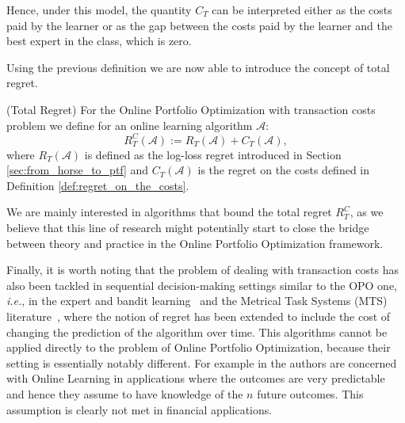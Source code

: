 Hence, under this model, the quantity $C_T$ can be interpreted either as the costs paid by the learner or as the gap between the costs paid by the learner and the best expert in the class, which is zero.

Using the previous definition we are now able to introduce the concept of total regret.

\begin{definition}(Total Regret)\label{def:totoal_regret}
For the Online Portfolio Optimization with transaction costs problem we define for an online learning algorithm $\mathcal A$: 
\begin{equation}
R_T^C(\mathcal A):=R_T(\mathcal A)+C_T(\mathcal A),
\end{equation}
where $R_T(\mathcal A)$ is defined as the log-loss regret introduced in Section \ref{sec:from_horse_to_ptf} and $C_T(\mathcal A)$ is the regret on the costs defined in Definition \ref{def:regret_on_the_costs}.
\end{definition}

We are mainly interested in algorithms that bound the total regret $R_T^C$, as we believe that this line of research might potentially start to close the bridge between theory and practice in the Online Portfolio Optimization framework.

Finally, it is worth noting that the problem of dealing with transaction costs has also been tackled in sequential decision-making settings similar to the OPO one, \emph{i.e.}, in the expert and bandit learning~\cite{li2018online,cesa2013online,trovo2016budgeted} and the Metrical Task Systems (MTS) literature~\cite{lin2012online}, where the notion of regret has been extended to include the cost of changing the prediction of the algorithm over time. This algorithms cannot be applied directly to the problem of Online Portfolio Optimization, because their setting is essentially notably different. For example in \cite{li2018online} the authors are concerned with Online Learning in applications where the outcomes are very predictable and hence they assume to have knowledge of the $n$ future outcomes. This assumption is clearly not met in financial applications.


